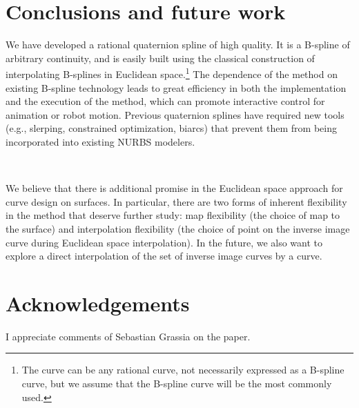 \section{Conclusions and future work}
\label{sec:conclusions}

We have developed a rational quaternion spline of high quality.
It is a B-spline of arbitrary continuity, and is easily built
using the classical construction of interpolating B-splines in Euclidean 
space.\footnote{The curve can be any rational curve, not necessarily expressed
	as a B-spline curve, but we assume that the B-spline curve will be the
	most commonly used.}
The dependence of the method on existing B-spline technology leads to
great efficiency in both the implementation and the execution of the
method, which can promote interactive control for animation or robot motion.
Previous quaternion splines have required new tools (e.g., slerping,
constrained optimization, biarcs) that prevent them from being
incorporated into existing NURBS modelers.

\

We believe that there is additional promise in the Euclidean space approach
for curve design on surfaces.
In particular, there are two forms of inherent flexibility in the method
that deserve further study:
map flexibility (the choice of map to the surface)
and interpolation flexibility (the choice of point on the inverse image curve
during Euclidean space interpolation).
In the future, we also want to explore a direct interpolation of the set
of inverse image curves by a curve.

\section{Acknowledgements}

I appreciate comments of Sebastian Grassia on the paper.

